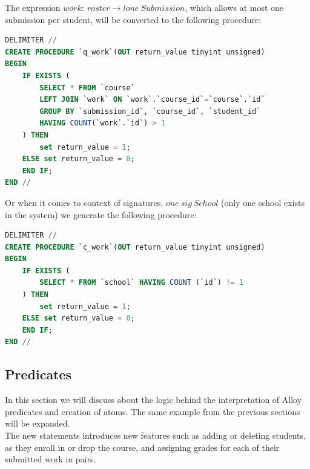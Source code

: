 \documentclass[oneside]{book}
\begin{document}
The expression $work:\ roster \rightarrow lone\ Submission$, which allows at most one submission per student, will be converted to the following procedure:

\begin{lstlisting}[escapechar=@,language=SQL]
DELIMITER //
CREATE PROCEDURE `q_work`(OUT return_value tinyint unsigned)
BEGIN
	IF EXISTS (
		SELECT * FROM `course`
		LEFT JOIN `work` ON `work`.`course_id`=`course`.`id`
		GROUP BY `submission_id`, `course_id`, `student_id` 
		HAVING COUNT(`work`.`id`) > 1
	) THEN
		set return_value = 1;
	ELSE set return_value = 0;
	END IF;
END //
\end{lstlisting}

Or when it comes to context of signatures, $one\ sig\ School {}$ (only one school exists in the system) we generate the following procedure:

\begin{lstlisting}[escapechar=@,language=SQL]
DELIMITER //
CREATE PROCEDURE `c_work`(OUT return_value tinyint unsigned)
BEGIN
	IF EXISTS (
		SELECT * FROM `school` HAVING COUNT (`id`) != 1
	) THEN
		set return_value = 1;
	ELSE set return_value = 0;
	END IF;
END //
\end{lstlisting}

\subsection{Predicates}
\label{sec:predicatesgen}
In this section we will discuss about the logic behind the interpretation of Alloy predicates and creation of atoms. The same example from the previous sections will be expanded.\\

\noindent The new statements introduces new features such as adding or deleting students, as they enroll in or drop the course, and assigning grades for each of their submitted work in pairs.\\
\end{document}
